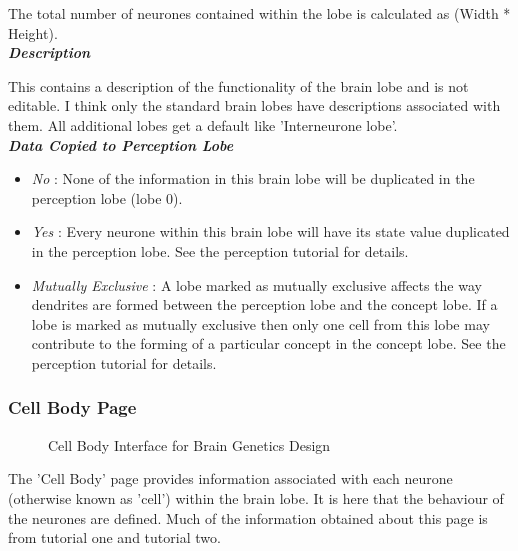 \documentclass[11pt,twoside,a4paper]{article}
\begin{document}
The total number of neurones contained within the lobe is calculated as (Width * Height).~\\ %

\textbf{\textit{Description}}

This contains a description of the functionality of the brain lobe and is not editable. I think only the standard brain lobes have descriptions associated with them. All additional lobes get a default like 'Interneurone lobe'.~\\

\textbf{\textit{Data Copied to Perception Lobe}}
\begin{itemize}
	\item[] \emph{No} : None of the information in this brain lobe will be duplicated in the perception lobe (lobe 0).
	\item[] \emph{Yes} : Every neurone within this brain lobe will have its state value duplicated in the perception lobe. See the perception tutorial for details.
\item[] \textit{Mutually Exclusive} : A lobe marked as mutually exclusive affects the way dendrites are formed between the perception lobe and the concept lobe. If a lobe is marked as mutually exclusive then only one cell from this lobe may contribute to the forming of a particular concept in the concept lobe. See the perception tutorial for details. 
\end{itemize}

\subsubsection{Cell Body Page}

\begin{minipage}{0.5\linewidth}
\begin{figure}[H]
	\centerline {} %
	\caption{Cell Body Interface for Brain Genetics Design}
	\label{fig:brain_cellbody}
\end{figure}
\end{minipage}
\begin{minipage}{0.1\linewidth}\end{minipage}
\begin{minipage}{0.4\linewidth}
The 'Cell Body' page provides information associated with each neurone (otherwise known as 'cell') within the brain lobe. It is here that the behaviour of the neurones are defined. Much of the information obtained about this page is from tutorial one and tutorial two.
\end{minipage}~\\
\end{document}
